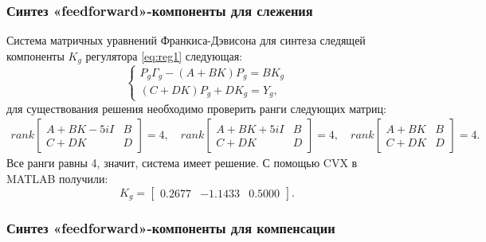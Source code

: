 \subsubsection{Синтез «feedforward»-компоненты для слежения}

Система матричных уравнений Франкиса-Дэвисона для синтеза 
следящей компоненты $K_g$ регулятора \eqref{eq:reg1} следующая:
\begin{equation*}
    \begin{cases}
        P_g\Gamma_g-(A+BK)P_g=BK_g\\
        (C+DK)P_g+DK_g=Y_g,
    \end{cases}
\end{equation*}
для существования решения необходимо проверить ранги следующих матриц:
\begin{gather*}
    rank\begin{bmatrix}
        A+BK-5iI & B \\
        C+DK & D
    \end{bmatrix}=4,\quad
    rank\begin{bmatrix}
        A+BK+5iI & B \\
        C+DK & D
    \end{bmatrix}=4,\quad
    rank\begin{bmatrix}
        A+BK & B \\
        C+DK & D
    \end{bmatrix}=4.
\end{gather*}
Все ранги равны 4, значит, система имеет решение.
С помощью CVX в MATLAB получили:
\begin{equation}
    \label{eq:Kg}
    K_g=\begin{bmatrix}
        0.2677	&-1.1433	&0.5000
    \end{bmatrix}.
\end{equation}

\subsubsection{Синтез «feedforward»-компоненты для компенсации}

